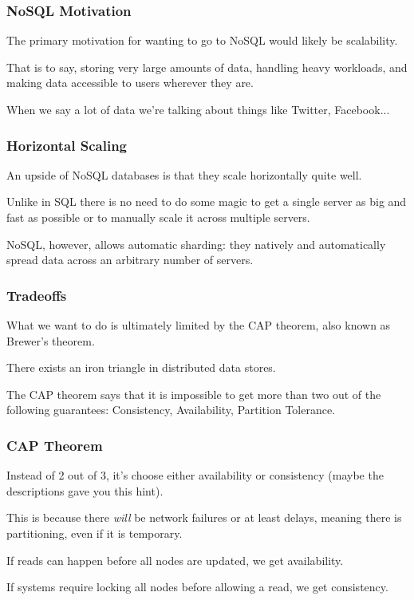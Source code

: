 \begin{frame}
\frametitle{NoSQL Motivation}

The primary motivation for wanting to go to NoSQL would likely be scalability. 

That is to say, storing very large amounts of data, handling heavy workloads, and making data accessible to users wherever they are. 

When we say a lot of data we're talking about things like Twitter, Facebook...

\end{frame}



\begin{frame}
\frametitle{Horizontal Scaling}

An upside of NoSQL databases is that they scale horizontally quite well. 

Unlike in SQL there is no need to do some magic to get a single server as big and fast as possible or to manually scale it across multiple servers. 

NoSQL, however, allows \alert{automatic sharding}: they natively and automatically spread data across an arbitrary number of servers.  


\end{frame}



\begin{frame}
\frametitle{Tradeoffs}

What we want to do is ultimately limited by the CAP theorem, also known as Brewer's theorem. 

There exists an iron triangle in distributed data stores.

 The CAP theorem says that it is impossible to get more than two out of the following guarantees: Consistency, Availability, Partition Tolerance.

\end{frame}



\begin{frame}
\frametitle{CAP Theorem}

Instead of 2 out of 3, it's choose either availability or consistency (maybe the descriptions gave you this hint). 

This is because there \textit{will} be network failures or at least delays, meaning there is partitioning, even if it is temporary. 

If reads can happen before all nodes are updated, we get availability. 

If systems require locking all nodes before allowing a read, we get consistency.

\end{frame}



